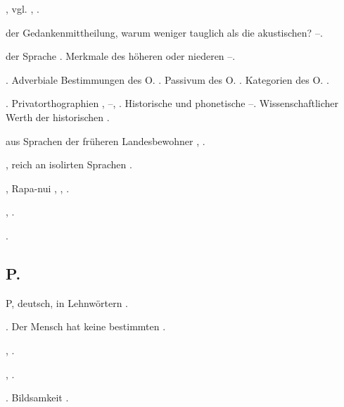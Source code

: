 \begin{register}
, vgl. ,  \pageref{sp.103}.


 der Gedankenmittheilung, warum weniger tauglich als die akustischen? \pageref{sp.311}–\pageref{sp.312}.

 der Sprache \pageref{sp.17}. Merkmale des höheren oder niederen \pageref{sp.389}–\pageref{sp.394}.

. Adverbiale Bestimmungen des O. \pageref{sp.101}. Passivum des O. \pageref{sp.102}. Kategorien des O. \pageref{sp.446}.

. Privatorthographien \pageref{sp.108}, \pageref{sp.115}–\pageref{sp.116}, \pageref{sp.133}. Historische und phonetische \pageref{sp.132}–\pageref{sp.133}. Wissenschaftlicher Werth der historischen \pageref{sp.175}.

 aus Sprachen der früheren Landesbewohner \pageref{sp.265}, \pageref{sp.286}.


, reich an isolirten Sprachen \pageref{sp.147}.

, Rapa-nui \pageref{sp.142}, \pageref{sp.147}, \pageref{sp.177}.


 \pageref{sp.257}, \pageref{sp.423}.

 \pageref{sp.163}.

\subsection*{P.}\label{reg.P}

P, deutsch, in Lehnwörtern \pageref{sp.186}.

. Der Mensch hat keine bestimmten \pageref{sp.306}.

,  \pageref{sp.157}.

 \pageref{sp.37}, \pageref{sp.201}.



. Bildsamkeit \pageref{sp.349}.



\end{register}
